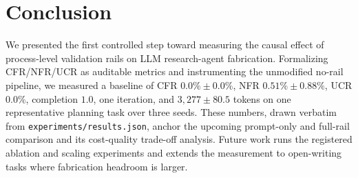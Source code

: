 \documentclass[10pt,twocolumn]{article}
\begin{document}
\section{Conclusion}
\label{sec:conclusion}

We presented the first controlled step toward measuring the causal effect of process-level validation rails on LLM research-agent fabrication. Formalizing CFR/NFR/UCR as auditable metrics and instrumenting the unmodified no-rail pipeline, we measured a baseline of CFR $0.0\% \pm 0.0\%$, NFR $0.51\% \pm 0.88\%$, UCR $0.0\%$, completion $1.0$, one iteration, and $3{,}277 \pm 80.5$ tokens on one representative planning task over three seeds. These numbers, drawn verbatim from \texttt{experiments/results.json}, anchor the upcoming prompt-only and full-rail comparison and its cost-quality trade-off analysis. Future work runs the registered ablation and scaling experiments and extends the measurement to open-writing tasks where fabrication headroom is larger.



\end{document}
